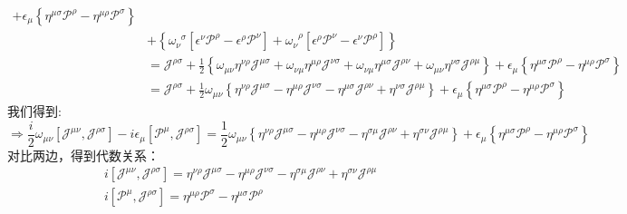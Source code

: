 \[\begin{aligned}
                    +\epsilon_\mu\left\{\eta^{\mu\sigma}\mathscr{P}^\rho-\eta^{\mu\rho}\mathscr{P}^\sigma\right\}
                    \\&+\left\{\omega_\nu^{\;\;\sigma}\left[\epsilon^\nu\mathscr{P}^\rho-\epsilon^\rho\mathscr{P}^\nu\right]
                    +\omega_\nu^{\;\;\rho} \left[\epsilon^\rho\mathscr{P}^\nu-\epsilon^\nu\mathscr{P}^\rho\right]\right\}\\
                    &=\mathscr{J}^{\rho\sigma}+\frac{1}{2}
                    \left\{\omega_{\mu\nu}\eta^{\nu\rho}\mathscr{J}^{\mu\sigma}+ \omega_{\nu\mu}\eta^{\mu\rho}\mathscr{J}^{\nu\sigma}
                    +\omega_{\nu\mu}\eta^{\mu\sigma}\mathscr{J}^{\rho\nu}+\omega_{\mu\nu}\eta^{\nu\sigma}\mathscr{J}^{\rho\mu}\right\}
                    +\epsilon_\mu\left\{\eta^{\mu\sigma}\mathscr{P}^\rho-\eta^{\mu\rho}\mathscr{P}^\sigma\right\}\\
                    &=\mathscr{J}^{\rho\sigma}+\frac{1}{2}
                    \omega_{\mu\nu}\left\{\eta^{\nu\rho}\mathscr{J}^{\mu\sigma}-\eta^{\mu\rho}\mathscr{J}^{\nu\sigma}
                    -\eta^{\mu\sigma}\mathscr{J}^{\rho\nu}+\eta^{\nu\sigma}\mathscr{J}^{\rho\mu}\right\}
                    +\epsilon_\mu\left\{\eta^{\mu\sigma}\mathscr{P}^\rho-\eta^{\mu\rho}\mathscr{P}^\sigma\right\}
        \end{aligned}
    \]
我们得到:
\[
    \Rightarrow \frac{i}{2}\omega_{\mu\nu}\left[\mathscr{J}^{\mu\nu},\mathscr{J}^{\rho\sigma} \right]
    -i\epsilon_\mu\left[\mathscr{P}^\mu,\mathscr{J}^{\rho\sigma} \right]=
    \frac{1}{2}\omega_{\mu\nu}\left\{\eta^{\nu\rho}\mathscr{J}^{\mu\sigma}
    -\eta^{\mu\rho}\mathscr{J}^{\nu\sigma}
    -\eta^{\sigma\mu}\mathscr{J}^{\rho\nu}
    +\eta^{\sigma\nu}\mathscr{J}^{\rho\mu}\right\}
    +\epsilon_\mu\left\{\eta^{\mu\sigma}\mathscr{P}^\rho
    -\eta^{\mu\rho}\mathscr{P}^\sigma\right\} 
\]
对比两边，得到代数关系：
\begin{subequations}\label{4.4}
    \begin{align}
    &i\left[\mathscr{J}^{\mu\nu},\mathscr{J}^{\rho\sigma}\right]
    =\eta^{\nu\rho}\mathscr{J}^{\mu\sigma}
    -\eta^{\mu\rho}\mathscr{J}^{\nu\sigma}
    -\eta^{\sigma\mu}\mathscr{J}^{\rho\nu}
    +\eta^{\sigma\nu}\mathscr{J}^{\rho\mu}
    \\
    &i\left[\mathscr{P}^\mu,\mathscr{J}^{\rho\sigma}\right]
    =\eta^{\mu\rho}\mathscr{P}^\sigma
    -\eta^{\mu\sigma}\mathscr{P}^\rho
    \end{align}
\end{subequations}
